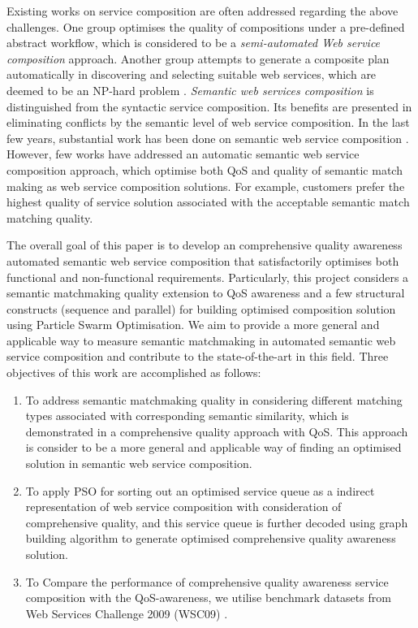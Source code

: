 \documentclass{llncs}
\begin{document}
Existing works on service composition are often addressed regarding the above challenges. One group optimises the quality of compositions under a pre-defined abstract workflow, which is considered to be a \textit{semi-automated Web service composition} approach. Another group attempts to generate a composite plan automatically in discovering and selecting suitable web services, which are deemed to be an NP-hard problem \cite{moghaddam2014service}. \textit{Semantic web services composition} is distinguished from the syntactic service composition. Its benefits are presented in eliminating conflicts by the semantic level of web service composition. In the last few years, substantial work has been done on semantic web service composition \cite{fensel2011semantic,lecue2009optimizing}. However, few works have addressed an automatic semantic web service composition approach, which optimise both QoS and quality of semantic match making as web service composition solutions. For example, customers prefer the highest quality of service solution associated with the acceptable semantic match matching quality.

The overall goal of this paper is to develop an comprehensive quality awareness automated semantic web service composition that satisfactorily optimises both functional and non-functional requirements. Particularly, this project considers a semantic matchmaking quality extension to QoS awareness and a few structural constructs (sequence and parallel) for building optimised composition solution using Particle Swarm Optimisation. We aim to provide a more general and applicable way to measure semantic matchmaking in automated semantic web service composition and contribute to the state-of-the-art in this field. Three objectives of this work are accomplished as follows:

\begin{enumerate}
 \item To address semantic matchmaking quality in considering different matching types associated with corresponding semantic similarity, which is demonstrated in a comprehensive quality approach with QoS. This approach is consider to be a more general and applicable way of finding an optimised solution in semantic web service composition.
 
 \item To apply PSO for sorting out an optimised service queue as a indirect representation of web service composition with consideration of comprehensive quality, and this service queue is further decoded using graph building algorithm to generate optimised comprehensive quality awareness solution.
  
 \item To Compare the performance of comprehensive quality awareness service composition with the QoS-awareness, we utilise benchmark datasets from Web Services Challenge 2009 (WSC09) \cite{kona2009wsc}.
\end{enumerate}
\end{document}

